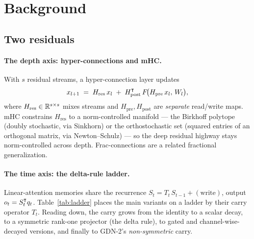 \documentclass[11pt,letterpaper,logo]{yalearxiv}
\newcommand{\Tcarry}{T}                        %
\newcommand{\Hres}{H_{\mathrm{res}}}
\newcommand{\Hpre}{H_{\mathrm{pre}}}
\newcommand{\Hpost}{H_{\mathrm{post}}}
\begin{document}
\section{Background}
\label{sec:bg}

\subsection{Two residuals}
\label{sec:two-residuals}

\paragraph{The depth axis: hyper-connections and mHC.} With $s$ residual streams, a
hyper-connection layer updates
\begin{equation}
  x_{l+1} \;=\; \Hres\, x_l \;+\; \Hpost^{\tr}\, F\!\big(\Hpre\, x_l,\, W_l\big),
  \label{eq:hc}
\end{equation}
where $\Hres \in \R^{s\times s}$ mixes streams and $\Hpre,\Hpost$ are \emph{separate}
read/write maps. mHC \citep{deepseek2025mhc} constrains $\Hres$ to a norm-controlled
manifold --- the Birkhoff polytope (doubly stochastic, via Sinkhorn) or the orthostochastic
set (squared entries of an orthogonal matrix, via Newton--Schulz) --- so the deep residual
highway stays norm-controlled across depth. Frac-connections
\citep{zhu2025fracconnections} are a related fractional generalization.

\paragraph{The time axis: the delta-rule ladder.} Linear-attention memories share the
recurrence $S_t = \Tcarry_t\, S_{t-1} + (\text{write})$, output $o_t = S_t^{\intercal} q_t$.
Table~\ref{tab:ladder} places the main variants on a ladder by their carry operator
$\Tcarry_t$. Reading down, the carry grows from the identity to a scalar decay, to a
symmetric rank-one projector (the delta rule), to gated and channel-wise-decayed versions,
and finally to GDN-2's \emph{non-symmetric} carry.
\end{document}
